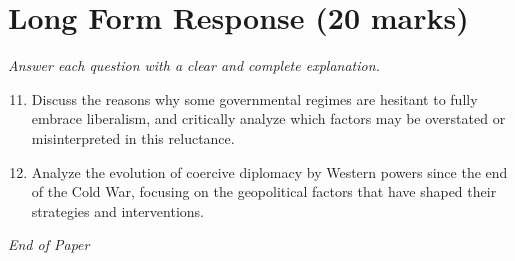 \documentclass[12pt]{article}
\begin{document}
\section*{Long Form Response (20 marks)}
\textit{Answer each question with a clear and complete explanation.}
\begin{enumerate}[label=\arabic*.]
\setcounter{enumi}{10}
\item Discuss the reasons why some governmental regimes are hesitant to fully embrace liberalism, and critically analyze which factors may be overstated or misinterpreted in this reluctance.
\item Analyze the evolution of coercive diplomacy by Western powers since the end of the Cold War, focusing on the geopolitical factors that have shaped their strategies and interventions.
\end{enumerate}

\vfill
\noindent\textit{End of Paper}
\end{document}
